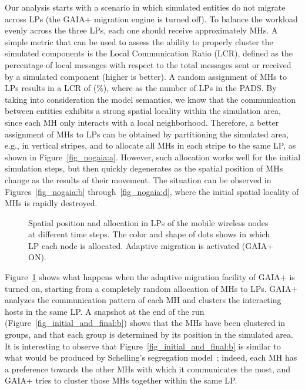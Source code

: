 \documentclass[1p]{elsarticle}
\begin{document}
Our analysis starts with a scenario in which simulated entities do not
migrate across LPs (the GAIA+ migration engine is turned off).  To
balance the workload evenly across the three LPs, each one should
receive approximately  MHs.  A simple metric that can
be used to assess the ability to properly cluster the simulated
components is the Local Communication Ratio (LCR), defined as the
percentage of local messages with respect to the total messages sent
or received by a simulated component (higher is better). A random
assignment of MHs to LPs results in a LCR of  (\%),
where  as the number of LPs in the PADS. By taking into
consideration the model semantics, we know that the communication
between entities exhibits a strong spatial locality within the
simulation area, since each MH only interacts with a local
neighborhood. Therefore, a better assignment of MHs to LPs can be
obtained by partitioning the simulated area, e.g., in vertical
stripes, and to allocate all MHs in each stripe to the same LP, as
shown in Figure~\ref{fig_nogaia:a}. However, such allocation works
well for the initial simulation steps, but then quickly degenerates as
the spatial position of MHs change as the results of their movement.
The situation can be observed in Figures~\ref{fig_nogaia:b}
through~\ref{fig_nogaia:d}, where the initial spatial locality of MHs
is rapidly destroyed.

\begin{figure}[ht]
\centering
{}
\caption{Spatial position and allocation in LPs of the mobile wireless
  nodes at different time steps. The color and shape of dots shows in
  which LP each node is allocated. Adaptive migration is activated
  (GAIA+ ON).}
\label{fig_initial_and_final}
\end{figure}

Figure~\ref{fig_initial_and_final} shows what happens when the
adaptive migration facility of GAIA+ is turned on, starting from a
completely random allocation of MHs to LPs.  GAIA+ analyzes the
communication pattern of each MH and clusters the interacting hosts in
the same LP. A snapshot at the end of the run
(Figure~\ref{fig_initial_and_final:b}) shows that the MHs have been
clustered in groups, and that each group is determined by its position
in the simulated area. It is interesting to observe that
Figure~\ref{fig_initial_and_final:b} is similar to what would be
produced by Schelling's segregation model~\cite{segregation}; indeed,
each MH has a preference towards the other MHs with which it
communicates the most, and GAIA+ tries to cluster those MHs together
within the same LP.
\end{document}
